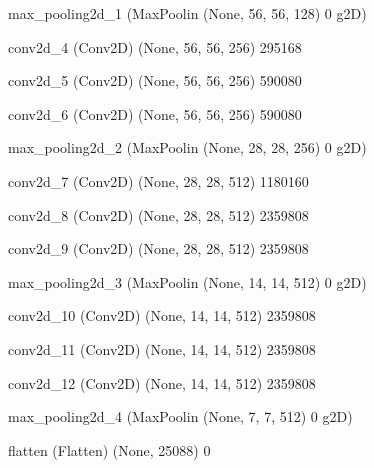 \documentclass[11pt, a4paper]{article} %
\begin{document}
 max_pooling2d_1 (MaxPoolin  (None, 56, 56, 128)       0         
 g2D)                                                            
                                                                 
 conv2d_4 (Conv2D)           (None, 56, 56, 256)       295168    
                                                                 
 conv2d_5 (Conv2D)           (None, 56, 56, 256)       590080    
                                                                 
 conv2d_6 (Conv2D)           (None, 56, 56, 256)       590080    
                                                                 
 max_pooling2d_2 (MaxPoolin  (None, 28, 28, 256)       0         
 g2D)                                                            
                                                                 
 conv2d_7 (Conv2D)           (None, 28, 28, 512)       1180160   
                                                                 
 conv2d_8 (Conv2D)           (None, 28, 28, 512)       2359808   
                                                                 
 conv2d_9 (Conv2D)           (None, 28, 28, 512)       2359808   
                                                                 
 max_pooling2d_3 (MaxPoolin  (None, 14, 14, 512)       0         
 g2D)                                                            
                                                                 
 conv2d_10 (Conv2D)          (None, 14, 14, 512)       2359808   
                                                                 
 conv2d_11 (Conv2D)          (None, 14, 14, 512)       2359808   
                                                                 
 conv2d_12 (Conv2D)          (None, 14, 14, 512)       2359808   
                                                                 
 max_pooling2d_4 (MaxPoolin  (None, 7, 7, 512)         0         
 g2D)                                                            
                                                                 
 flatten (Flatten)           (None, 25088)             0         
                                                                 
\end{document}
